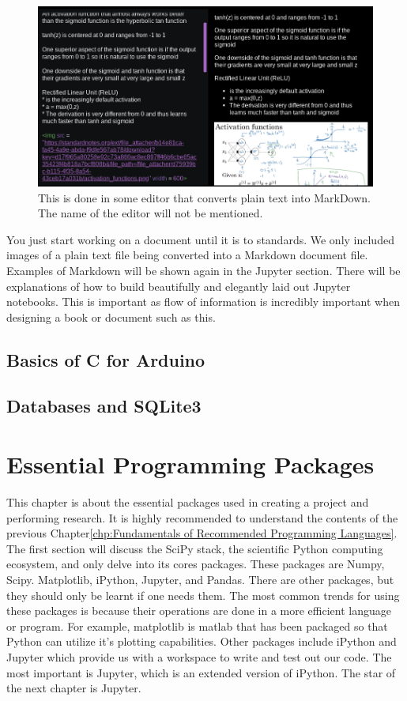\documentclass[11pt,a4paper]{book}
\begin{document}
		\begin{figure} [!ht]
			\centering
			\def\svgwidth{\columnwidth}
			\Huge
			\includegraphics[scale=0.5]{images/chapter-8/markdown_1}
			\caption{This is done in some editor that converts plain text into MarkDown. The name of the editor will not be mentioned.}
			\label{fig:markdown_1}
		\end{figure}
	
		You just start working on a document until it is to standards. We only included images of a plain text file being converted into a Markdown document file. Examples of Markdown will be shown again in the Jupyter section. There will be explanations of how to build beautifully and elegantly laid out Jupyter notebooks. This is important as flow of information is incredibly important when designing a book or document such as this.
		
	\section{Basics of C for Arduino}
	\section{Databases and SQLite3}
\chapter{Essential Programming Packages}
	\label{chp:Essential Programming Packages}
	This chapter is about the essential packages used in creating a project and performing research. It is highly recommended to understand the contents of the previous Chapter\ref{chp:Fundamentals of Recommended Programming Languages}. The first section will discuss the SciPy stack, the scientific Python computing ecosystem, and only delve into its cores packages. These packages are Numpy, Scipy. Matplotlib, iPython, Jupyter, and Pandas. There are other packages, but they should only be learnt if one needs them. 
	The most common trends for using these packages is because their operations are done in a more efficient language or program. For example, matplotlib is matlab that has been packaged so that Python can utilize it's plotting capabilities. Other packages include iPython and Jupyter which provide us with a workspace to write and test out our code. The most important is Jupyter, which is an extended version of iPython. The star of the next chapter is Jupyter.
\end{document}
